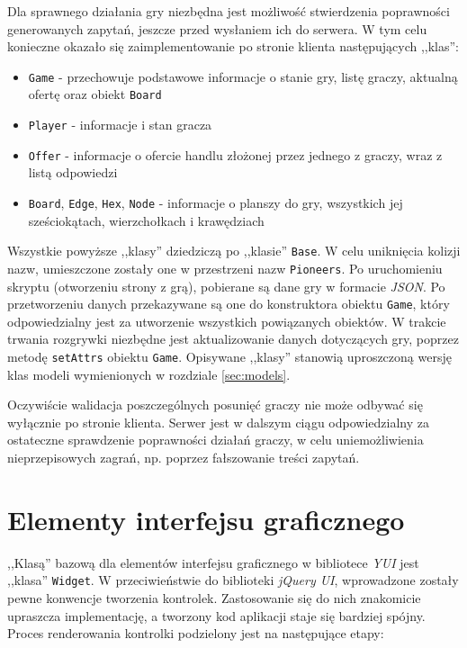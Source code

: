 \documentclass[11pt,twoside]{report}
\begin{document}
Dla sprawnego działania gry niezbędna jest możliwość stwierdzenia
poprawności generowanych zapytań, jeszcze przed wysłaniem ich do
serwera. W tym celu konieczne okazało się zaimplementowanie po stronie
klienta następujących ,,klas'':

\begin{itemize}
\item \texttt{Game} - przechowuje podstawowe informacje o stanie gry,
  listę graczy, aktualną ofertę oraz obiekt \texttt{Board}
\item \texttt{Player} - informacje i stan gracza
\item \texttt{Offer} - informacje o ofercie handlu złożonej przez
  jednego z graczy, wraz z listą odpowiedzi
\item \texttt{Board}, \texttt{Edge}, \texttt{Hex}, \texttt{Node} -
  informacje o planszy do gry, wszystkich jej sześciokątach,
  wierzchołkach i krawędziach
\end{itemize}

Wszystkie powyższe ,,klasy'' dziedziczą po ,,klasie'' \texttt{Base}. W
celu uniknięcia kolizji nazw, umieszczone zostały one w przestrzeni
nazw \texttt{Pioneers}. Po uruchomieniu skryptu (otworzeniu strony z
grą), pobierane są dane gry w formacie \emph{JSON}. Po przetworzeniu
danych przekazywane są one do konstruktora obiektu \texttt{Game},
który odpowiedzialny jest za utworzenie wszystkich powiązanych
obiektów. W trakcie trwania rozgrywki niezbędne jest aktualizowanie
danych dotyczących gry, poprzez metodę \texttt{setAttrs} obiektu
\texttt{Game}. Opisywane ,,klasy'' stanowią uproszczoną wersję klas
modeli wymienionych w rozdziale \ref{sec:models}.

Oczywiście walidacja poszczególnych posunięć graczy nie może odbywać
się wyłącznie po stronie klienta. Serwer jest w dalszym ciągu
odpowiedzialny za ostateczne sprawdzenie poprawności działań graczy, w
celu uniemożliwienia nieprzepisowych zagrań, np. poprzez fałszowanie
treści zapytań.

\section{Elementy interfejsu graficznego}

,,Klasą'' bazową dla elementów interfejsu graficznego w bibliotece
\emph{YUI} jest ,,klasa'' \texttt{Widget}. W przeciwieństwie do
biblioteki \emph{jQuery UI}, wprowadzone zostały pewne konwencje
tworzenia kontrolek. Zastosowanie się do nich znakomicie upraszcza
implementację, a tworzony kod aplikacji staje się bardziej
spójny. Proces renderowania kontrolki podzielony jest na następujące
etapy:
\end{document}
